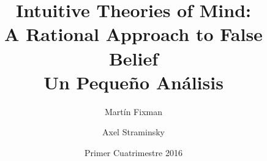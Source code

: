 \documentclass{beamer}
\title{Intuitive Theories of Mind: \\ A Rational Approach to False Belief \\ \vspace{1ex} {\large Un Pequeño Análisis}}
\author[Grupo 9]{%
	Martín Fixman \and
	Axel Straminsky
}
\date{Primer Cuatrimestre 2016}
\begin{document}
\begin{frame}[fragile]
\titlepage{}
\end{frame}
\end{document}
